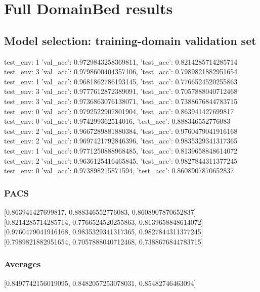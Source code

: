 \documentclass{article}
\begin{document}
\section{Full DomainBed results}

\subsection{Model selection: training-domain validation set}
test_env: 1
{'val_acc': 0.9729843258369811, 'test_acc': 0.8214285714285714}
test_env: 3
{'val_acc': 0.9798600404357106, 'test_acc': 0.7989821882951654}
test_env: 1
{'val_acc': 0.9681862786193145, 'test_acc': 0.7766524520255863}
test_env: 3
{'val_acc': 0.9777612872389091, 'test_acc': 0.7057888040712468}
test_env: 3
{'val_acc': 0.9736863076138071, 'test_acc': 0.7388676844783715}
test_env: 0
{'val_acc': 0.9792522907801904, 'test_acc': 0.863941427699817}
test_env: 0
{'val_acc': 0.974299362514016, 'test_acc': 0.888346552776083}
test_env: 2
{'val_acc': 0.9667289881880384, 'test_acc': 0.9760479041916168}
test_env: 2
{'val_acc': 0.9697421792846396, 'test_acc': 0.9835329341317365}
test_env: 1
{'val_acc': 0.9771250888968485, 'test_acc': 0.8139658848614072}
test_env: 2
{'val_acc': 0.9636125416465845, 'test_acc': 0.9827844311377245}
test_env: 0
{'val_acc': 0.973898215871594, 'test_acc': 0.8608907870652837}

\subsubsection{PACS}
[0.863941427699817, 0.888346552776083, 0.8608907870652837]
[0.8214285714285714, 0.7766524520255863, 0.8139658848614072]
[0.9760479041916168, 0.9835329341317365, 0.9827844311377245]
[0.7989821882951654, 0.7057888040712468, 0.7388676844783715]

\begin{center}
\end{center}

\subsubsection{Averages}
[0.8497742156019095, 0.8482057253078031, 0.85482746463094]

\begin{center}
\end{center}
\end{document}
